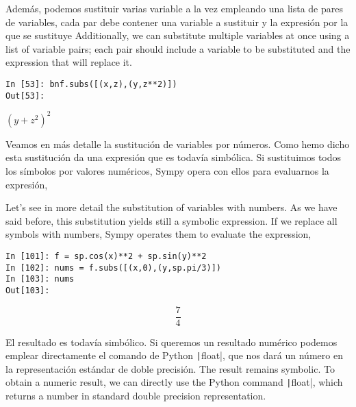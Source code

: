 \begin{paracol}{2}
Además, podemos sustituir varias variable a la vez empleando una lista de pares de variables, cada par debe contener una variable a sustituir y la expresión por la que se sustituye
\switchcolumn
Additionally, we can substitute multiple variables at once using a list of variable pairs; each pair should include a variable to be substituted and the expression that will replace it.

\end{paracol}
\begin{center}
	\begin{minipage}{.25\textwidth}
		\begin{verbatim}
In [53]: bnf.subs([(x,z),(y,z**2)])
Out[53]:
		\end{verbatim}
		$(y+z^2)^2$
	\end{minipage}
\end{center}
\begin{paracol}{2}
Veamos en más detalle la sustitución de variables por números. Como hemo dicho esta sustitución da una expresión que es todavía simbólica. Si sustituimos todos los símbolos por valores numéricos, Sympy opera con ellos para evaluarnos la expresión,

\switchcolumn
Let's see in more detail the substitution of variables with numbers. As we have said before, this substitution yields still a symbolic expression. If we replace all symbols with numbers, Sympy operates them to evaluate the expression,
\end{paracol}
\begin{center}
	\begin{minipage}{.5\textwidth}
		\begin{verbatim}
In [101]: f = sp.cos(x)**2 + sp.sin(y)**2
In [102]: nums = f.subs([(x,0),(y,sp.pi/3)])
In [103]: nums
Out[103]:
		\end{verbatim}
		\begin{equation*} \frac{7}{4}\end{equation*}
	\end{minipage}
\end{center}
\begin{paracol}{2}
El resultado es todavía simbólico. Si queremos un resultado numérico podemos emplear directamente el comando de Python \texttt|float|, que nos dará un número en la representación estándar de doble precisión.
\switchcolumn
The result remains symbolic. To obtain a numeric result, we can directly use the Python command \texttt|float|, which returns a number in standard double precision representation.
\end{paracol}
